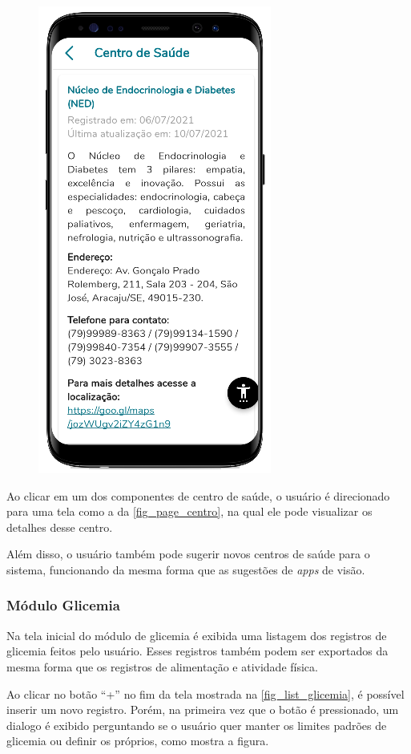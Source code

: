 \begin{figure}[htb]
\begin{minipage}{0.45\textwidth}
        \includegraphics[scale=0.7]{Imagens/desenvolvimento/app/page_centro.png}
    \end{minipage}
\end{figure}

Ao clicar em um dos componentes de centro de saúde, o usuário é direcionado para uma tela como a da
\autoref{fig_page_centro}, na qual ele pode visualizar os detalhes desse centro.

Além disso, o usuário também pode sugerir novos centros de saúde para o sistema, funcionando da mesma forma que as
sugestões de \emph{apps} de visão.

\subsubsection{Módulo Glicemia}

Na tela inicial do módulo de glicemia é exibida uma listagem dos registros de glicemia feitos pelo usuário.
Esses registros também podem ser exportados da mesma forma que os registros de alimentação e atividade física.

Ao clicar no botão “+” no fim da tela mostrada na \autoref{fig_list_glicemia}, é possível inserir um novo registro. Porém, na primeira vez que o botão
é pressionado, um dialogo é exibido perguntando se o usuário quer manter os limites padrões de glicemia ou
definir os próprios, como mostra a figura.

